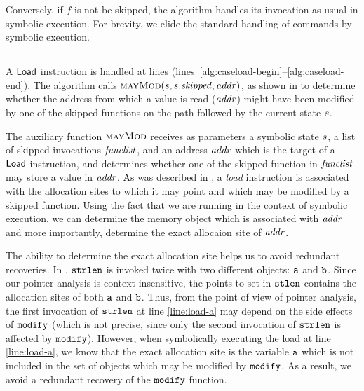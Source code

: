 Conversely, if $f$ is not be skipped, the algorithm handles its
invocation as usual in symbolic execution.  For brevity, we elide the
standard handling of commands by symbolic execution.

\subsection{}
A $\mathsf{Load}$ instruction is handled
at lines {(lines~\ref{alg:caseload-begin}--\ref{alg:caseload-end})}.
The algorithm calls $\Call{mayMod}{\workstate,\workstate.\skipped,\addr}$,
as shown in 
to determine whether the address from
which a value is read ($\mathit{addr}$) might have been modified by one of the
skipped functions on the path followed by the current state $s$.

The auxiliary function $\textsc{mayMod}$
receives as parameters a symbolic state $s$, a list of
skipped invocations $\mathit{funclist}$, and an address $\mathit{addr}$ which is the
target of a $\mathsf{Load}$ instruction, and determines whether one
of the skipped function in $\mathit{funclist}$ may store a value in $\mathit{addr}$.
As was described in ,
a \textit{load} instruction is associated with the allocation sites to
which it may point and which may be modified by a skipped function.
Using the fact that we are running in the context of symbolic execution,
we can determine the memory object which is associated with $\mathit{addr}$ and more importantly,
determine the exact allocaion site of $\mathit{addr}$.

The ability to determine the exact allocation site helps us to avoid redundant recoveries.
In , $\texttt{strlen}$ is invoked twice
with two different objects: $\texttt{a}$ and $\texttt{b}$.
Since our pointer analysis is context-insensitive,
the points-to set in $\texttt{stlen}$ contains the allocation sites of both $\texttt{a}$ and $\texttt{b}$.
Thus, from the point of view of pointer analysis,
the first invocation of $\texttt{strlen}$ at line \ref{line:load-a}
may depend on the side effects of $\texttt{modify}$
(which is not precise, since only the second invocation of $\texttt{strlen}$ is affected by $\texttt{modify}$).
However, when symbolically executing the load at line \ref{line:load-a},
we know that the exact allocation site is the variable $\texttt{a}$
which is not included in the set of objects which may be modified by $\texttt{modify}$.
As a result, we avoid a redundant recovery of the $\texttt{modify}$ function.

